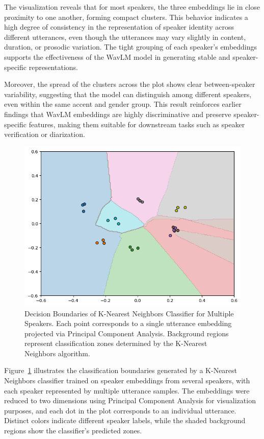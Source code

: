\documentclass[conference]{IEEEtran}
\begin{document}
The visualization reveals that for most speakers, the three embeddings lie in close proximity to one another, forming compact clusters. This behavior indicates a high degree of consistency in the representation of speaker identity across different utterances, even though the utterances may vary slightly in content, duration, or prosodic variation. The tight grouping of each speaker’s embeddings supports the effectiveness of the WavLM model in generating stable and speaker-specific representations.

Moreover, the spread of the clusters across the plot shows clear between-speaker variability, suggesting that the model can distinguish among different speakers, even within the same accent and gender group. This result reinforces earlier findings that WavLM embeddings are highly discriminative and preserve speaker-specific features, making them suitable for downstream tasks such as speaker verification or diarization.

\begin{figure}[h]
	\centering
	\includegraphics[width=0.7\linewidth]{img/img-knn-speaker-separation.png}
	\caption{Decision Boundaries of K-Nearest Neighbors Classifier for Multiple Speakers. Each point corresponds to a single utterance embedding projected via Principal Component Analysis. Background regions represent classification zones determined by the K-Nearest Neighbors algorithm.}
	\label{fig:knn-speaker}
\end{figure}


Figure~\ref{fig:knn-speaker} illustrates the classification boundaries generated by a K-Nearest Neighbors classifier trained on speaker embeddings from several speakers, with each speaker represented by multiple utterance samples. The embeddings were reduced to two dimensions using Principal Component Analysis for visualization purposes, and each dot in the plot corresponds to an individual utterance. Distinct colors indicate different speaker labels, while the shaded background regions show the classifier’s predicted zones.
\end{document}
